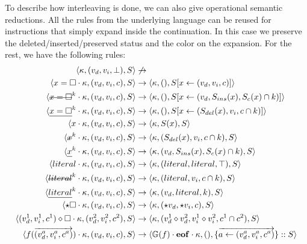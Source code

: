 \documentclass[a4paper,11pt]{article}
\newcommand\mathst[1]{\text{\st{$#1$}}}
\newcommand\mathul[1]{\text{\ul{$#1$}}}
\begin{document}
To describe how interleaving is done, we can also give operational semantic reductions. All the rules from the underlying language can be reused for instructions that simply expand inside the continuation. In this case we preserve the deleted/inserted/preserved status and the color on the expansion. For the rest, we have the following rules:
\begin{align*}
\langle \kappa, (v_d, v_i, \bot), S\rangle &\not\rightarrow\\
\langle x = \square \cdot \kappa, (v_d, v_i, c), S\rangle &\rightarrow \langle \kappa, (), S[x \leftarrow (v_d, v_i, c)]\rangle\\
\langle \mathst{x = \square}^k \cdot \kappa, (v_d, v_i, c), S\rangle &\rightarrow \langle \kappa, (), S[x \leftarrow (v_d, S_{ins}(x), S_c(x) \cap k)]\rangle\\
\langle \mathul{x = \square}^k \cdot \kappa, (v_d, v_i, c), S\rangle &\rightarrow \langle \kappa, (), S[x \leftarrow (S_{del}(x), v_i, c \cap k)]\rangle\\
\langle x \cdot \kappa, (v_d, v_i, c), S\rangle &\rightarrow \langle \kappa, S(x), S\rangle\\
\langle \mathst{x}^k \cdot \kappa, (v_d, v_i, c), S\rangle &\rightarrow \langle \kappa, (S_{del}(x), v_i, c \cap k), S\rangle\\
\langle \mathul{x}^k \cdot \kappa, (v_d, v_i, c), S\rangle &\rightarrow \langle \kappa, (v_d, S_{ins}(x), S_c(x) \cap k), S\rangle\\
\langle literal \cdot \kappa, (v_d, v_i, c), S\rangle &\rightarrow \langle \kappa, (literal, literal, \top), S\rangle\\
\langle \mathst{literal}^k \cdot \kappa, (v_d, v_i, c), S\rangle &\rightarrow \langle \kappa, (literal, v_i, c \cap k), S\rangle\\
\langle \mathul{literal}^k \cdot \kappa, (v_d, v_i, c), S\rangle &\rightarrow \langle \kappa, (v_d, literal, k), S\rangle\\
\langle \star \square \cdot \kappa, (v_d, v_i, c), S\rangle &\rightarrow \langle \kappa, (\star v_d, \star v_i, c), S\rangle\\
\langle (v_d^1, v_i^1, c^1) \diamond \square \cdot \kappa, (v_d^2, v_i^2, c^2), S\rangle &\rightarrow \langle \kappa, (v_d^1 \diamond v_d^2, v_i^1 \diamond v_i^2, c^1 \cap c^2), S\rangle\\
\langle f(\overrightarrow{(v_d^a, v_i^a, c^a)}) \cdot \kappa, (v_d, v_i, c), S\rangle &\rightarrow \langle \mathbb{G}(f) \cdot \mathbf{eof} \cdot \kappa, (), \{\overrightarrow{a \leftarrow (v_d^a, v_i^a, c^a)}\} :: S\rangle\\

\end{align*}
\end{document}
